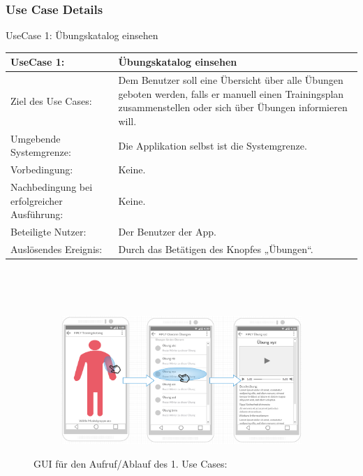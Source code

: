 \documentclass[FIPLY_base.tex]{subfiles}
\begin{document}
	\subsubsection{Use Case Details}
	UseCase 1: Übungskatalog einsehen
		\ \\
	\begin{center}
		\def\arraystretch{1.3}%
		\begin{tabular}{| p{3cm} | p{7cm} |}
			\hline
			UseCase 1: & Übungskatalog einsehen
			\\ \hline 
			Ziel des Use Cases: & Dem Benutzer soll eine Übersicht über alle Übungen geboten werden, falls er manuell einen Trainingsplan zusammenstellen oder sich über Übungen informieren will.
			\\ \hline
			Umgebende Systemgrenze: & Die Applikation selbst ist die Systemgrenze.
			\\ \hline
			Vorbedingung: & Keine.  
			\\ \hline
			Nachbedingung bei erfolgreicher Ausführung: & Keine.
			\\ \hline
			Beteiligte Nutzer: & Der Benutzer der App.
			\\ \hline
			Auslösendes Ereignis: & Durch das Betätigen des Knopfes „Übungen“.
			\\ \hline
		\end{tabular} \\
	\end{center}
		\ \\
	\begin{figure}[H]
		\begin{subfigure}[b]{0.3\textwidth}
			\centering
			\includegraphics[scale=0.32]{img/Trainingskatalog}
		\end{subfigure}
		\caption{	GUI für den Aufruf/Ablauf des 1. Use Cases:}
	\end{figure}
		\ \\
\end{document}
